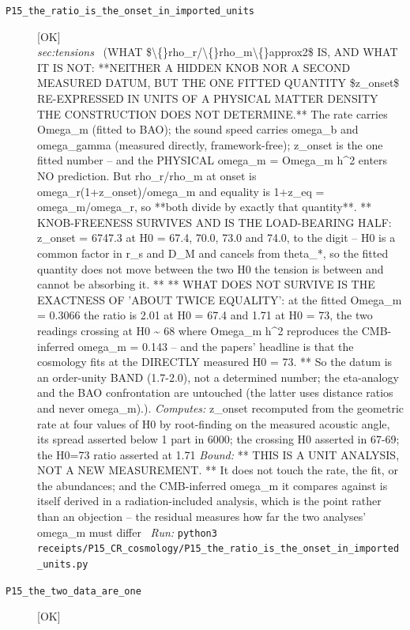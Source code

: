 \begin{description}
\item[\label{rcpt:P15_the_ratio_is_the_onset_in_imported_units}\texttt{P15\_the\_ratio\_is\_the\_onset\_in\_imported\_units}]\hfill\textsf{[OK]}\\
\textit{sec:tensions} \ (WHAT \$\textbackslash\{\}rho\_r/\textbackslash\{\}rho\_m\textbackslash\{\}approx2\$ IS, AND WHAT IT IS NOT: **NEITHER A HIDDEN KNOB NOR A SECOND MEASURED DATUM, BUT THE ONE FITTED QUANTITY \$z\_onset\$ RE-EXPRESSED IN UNITS OF A PHYSICAL MATTER DENSITY THE CONSTRUCTION DOES NOT DETERMINE.** The rate carries Omega\_m (fitted to BAO); the sound speed carries omega\_b and omega\_gamma (measured directly, framework-free); z\_onset is the one fitted number -- and the PHYSICAL omega\_m = Omega\_m h\textasciicircum{}2 enters NO prediction. But rho\_r/rho\_m at onset is omega\_r(1+z\_onset)/omega\_m and equality is 1+z\_eq = omega\_m/omega\_r, so **both divide by exactly that quantity**. ** KNOB-FREENESS SURVIVES AND IS THE LOAD-BEARING HALF: z\_onset = 6747.3 at H0 = 67.4, 70.0, 73.0 and 74.0, to the digit -- H0 is a common factor in r\_s and D\_M and cancels from theta\_*, so the fitted quantity does not move between the two H0 the tension is between and cannot be absorbing it. ** ** WHAT DOES NOT SURVIVE IS THE EXACTNESS OF 'ABOUT TWICE EQUALITY': at the fitted Omega\_m = 0.3066 the ratio is 2.01 at H0 = 67.4 and 1.71 at H0 = 73, the two readings crossing at H0 \textasciitilde{} 68 where Omega\_m h\textasciicircum{}2 reproduces the CMB-inferred omega\_m = 0.143 -- and the papers' headline is that the cosmology fits at the DIRECTLY measured H0 = 73. ** So the datum is an order-unity BAND (1.7-2.0), not a determined number; the eta-analogy and the BAO confrontation are untouched (the latter uses distance ratios and never omega\_m).). 
\emph{Computes:} z\_onset recomputed from the geometric rate at four values of H0 by root-finding on the measured acoustic angle, its spread asserted below 1 part in 6000; the crossing H0 asserted in 67-69; the H0=73 ratio asserted at 1.71
 \emph{Bound:} ** THIS IS A UNIT ANALYSIS, NOT A NEW MEASUREMENT. ** It does not touch the rate, the fit, or the abundances; and the CMB-inferred omega\_m it compares against is itself derived in a radiation-included analysis, which is the point rather than an objection -- the residual measures how far the two analyses' omega\_m must differ
\ \emph{Run:} \texttt{python3 receipts/P15\_CR\_cosmology/P15\_the\_ratio\_is\_the\_onset\_in\_imported\_units.py}
\item[\label{rcpt:P15_the_two_data_are_one}\texttt{P15\_the\_two\_data\_are\_one}]\hfill\textsf{[OK]}\\

\end{description}
